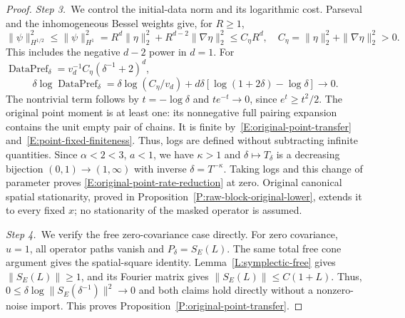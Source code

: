 \begin{proof}
  \medskip
  \noindent\textit{Step 3.~}We control the initial-data norm and its
  logarithmic cost.
  Parseval and the inhomogeneous Bessel weights give, for $R \ge 1$,
  \[
    \|\psi\|_{H^{1/2}}^2\le\|\psi\|_{H^1}^2
    =R^d\|\eta\|_2^2+R^{d-2}\|\nabla\eta\|_2^2
    \le C_\eta R^d,\quad C_\eta=\|\eta\|_2^2+\|\nabla\eta\|_2^2>0.
  \]
  This includes the negative $d-2$ power in $d = 1$. For
  $\operatorname{DataPref}_\delta = v_d^{-1}C_\eta(\delta^{-1}+2)^d$,
  \[
    \delta\log\operatorname{DataPref}_\delta
    =\delta\log(C_\eta/v_d)+d\delta[\log(1+2\delta)-\log\delta]\to0 .
  \]
  The nontrivial term follows by $t = -\log\delta$ and $te^{-t} \to 0$, since
  $e^t \ge t^2/2$. The original point moment is at least one: its nonnegative
  full pairing expansion contains the unit empty pair of chains. It is finite
  by~\eqref{E:original-point-transfer} and~\eqref{E:point-fixed-finiteness}.
  Thus, logs are defined without subtracting infinite quantities. Since $\alpha
  < 2 < 3$, $a < 1$, we have $\kappa > 1$ and $\delta\mapsto T_\delta$ is a
  decreasing bijection $(0,1) \to (1,\infty)$ with inverse $\delta =
  T^{-\kappa}$. Taking logs and this change of parameter proves
  \eqref{E:original-point-rate-reduction} at zero. Original canonical spatial
  stationarity, proved in Proposition~\ref{P:raw-block-original-lower}, extends
  it to every fixed $x$; no stationarity of the masked operator is assumed.


  \medskip
  \noindent\textit{Step 4.~}We verify the free zero-covariance case directly.
  For zero covariance, $u = 1$, all operator paths vanish and $P_\delta =
  S_E(L)$. The same total free cone argument gives the spatial-square identity.
  Lemma~\ref{L:symplectic-free} gives $\|S_E(L)\| \ge 1$, and its Fourier matrix
  gives $\|S_E(L)\| \le C(1+L)$. Thus, $0 \le \delta\log\|S_E(\delta^{-1})\|^2
  \to 0$ and both claims hold directly without a nonzero-noise import. This
  proves Proposition~\ref{P:original-point-transfer}.
\end{proof}



